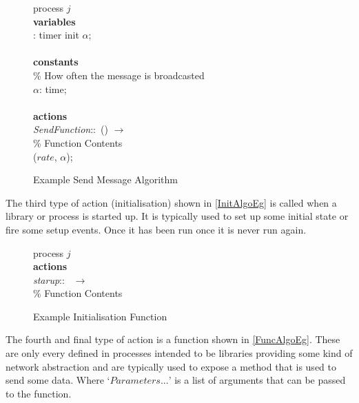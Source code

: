 \begin{figure}[H]
  \centering
  \begin{boxedminipage}{\linewidth}
    \null process $j$\\
    \null \textbf{variables}\\
    \null\qq {}: timer init $\alpha$;\\~\\
    \null \textbf{constants}\\
    \null\qq \% How often the message is broadcasted\\
    \null\qq $\alpha$: time;\\~\\
    \null \textbf{actions}\\
    \null\qq \emph{SendFunction}::~() $\rightarrow$\\
    \null\qq\qq \% Function Contents\\
    \null\qq\qq {}($\mathit{rate}$, $\alpha$); \\
  \end{boxedminipage}
  \caption{Example Send Message Algorithm}
  \label{SendAlgoEg}
\end{figure}

The third type of action (initialisation) shown in \autoref{InitAlgoEg} is called when a library or process is started up. It is typically used to set up some initial state or fire some setup events. Once it has been run once it is never run again.

\begin{figure}[H]
  \centering
  \begin{boxedminipage}{\linewidth}
    \null process $j$\\
    \null \textbf{actions}\\
    \null\qq \emph{starup}::~ $\rightarrow$\\
    \null\qq\qq \% Function Contents\\
  \end{boxedminipage}
  \caption{Example Initialisation Function}
  \label{InitAlgoEg}
\end{figure}

The fourth and final type of action is a function shown in \autoref{FuncAlgoEg}. These are only every defined in processes intended to be libraries providing some kind of network abstraction and are typically used to expose a method that is used to send some data. Where `$Parameters...$' is a list of arguments that can be passed to the function.

